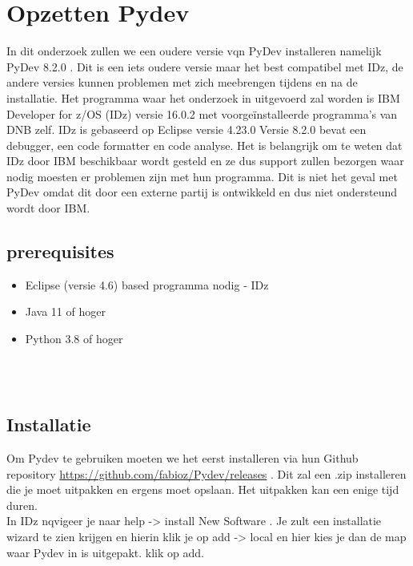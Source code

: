 
\chapter{Opzetten Pydev}
\label{ch:opzetten-pydev}

In dit onderzoek zullen we een oudere versie vqn PyDev installeren namelijk PyDev 8.2.0 . Dit is een iets oudere versie maar het best compatibel met IDz, de andere versies kunnen problemen met zich meebrengen tijdens en na de installatie. Het programma waar het onderzoek in uitgevoerd zal worden is IBM Developer for z/OS (IDz) versie 16.0.2 met voorgeïnstalleerde programma's van DNB zelf. IDz is gebaseerd op Eclipse versie 4.23.0
Versie 8.2.0 bevat een debugger, een code formatter en code analyse. Het is belangrijk om te weten dat IDz door IBM beschikbaar wordt gesteld en ze dus support zullen bezorgen waar nodig moesten er problemen zijn met hun programma. Dit is niet het geval met PyDev omdat dit door een externe partij is ontwikkeld en dus niet ondersteund wordt door IBM. \\

\section{prerequisites}
\begin{itemize}
    \item Eclipse (versie 4.6) based programma nodig - IDz
    \item Java 11 of hoger
    \item Python 3.8 of hoger
\end{itemize}

\\
\\
\section{Installatie}
Om Pydev te gebruiken moeten we het eerst installeren via hun Github repository \url{https://github.com/fabioz/Pydev/releases} . Dit zal een .zip installeren die je moet uitpakken en ergens moet opslaan. Het uitpakken kan een enige tijd duren. \\

In IDz nqvigeer je naar help -> install New Software . Je zult een installatie wizard te zien krijgen en hierin klik je op add -> local en hier kies je dan de map waar Pydev in is uitgepakt. klik op add.


